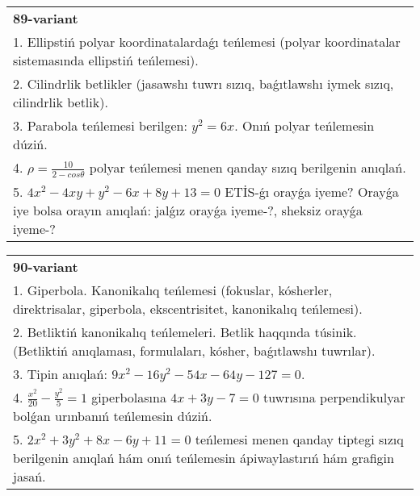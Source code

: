 \documentclass{article}
\begin{document}
\begin{tabular}{m{17cm}}
\textbf{89-variant}\\
1. Ellipstiń polyar koordinatalardaǵı teńlemesi (polyar koordinatalar sistemasında ellipstiń teńlemesi).\\

2. Cilindrlik betlikler (jasawshı tuwrı sızıq, baǵıtlawshı iymek sızıq, cilindrlik betlik).\\

3. Parabola teńlemesi berilgen: $y^2=6 x$. Onıń polyar teńlemesin dúziń.\\

4. $\rho = \frac{10}{2 - cos\theta}$ polyar teńlemesi menen qanday sızıq berilgenin anıqlań.  \\

5. $4x^{2} - 4xy + y^{2} - 6x + 8y + 13 = 0$ ETİS-ǵı orayǵa iyeme? Orayǵa iye bolsa orayın anıqlań: jalǵız orayǵa iyeme-?, sheksiz orayǵa iyeme-?  
\end{tabular}
\vspace{1cm}


\begin{tabular}{m{17cm}}
\textbf{90-variant}\\
1. Giperbola. Kanonikalıq teńlemesi (fokuslar, kósherler, direktrisalar, giperbola, ekscentrisitet, kanonikalıq teńlemesi).\\

2. Betliktiń kanonikalıq teńlemeleri. Betlik haqqında túsinik. (Betliktiń anıqlaması, formulaları, kósher, baǵıtlawshı tuwrılar).\\

3. Tipin anıqlań: $9 x^{2}-16 y^{2}-54 x-64 y-127=0$.\\

4. $\frac{x^{2}}{20} - \frac{y^{2}}{5} = 1$ giperbolasına $4x + 3y - 7 = 0$ tuwrısına perpendikulyar bolǵan urınbanıń teńlemesin dúziń.  \\

5. $2x^{2} + 3y^{2} + 8x - 6y + 11 = 0$ teńlemesi menen qanday tiptegi sızıq berilgenin anıqlań hám onıń teńlemesin ápiwaylastırıń hám grafigin jasań.  
\end{tabular}
\vspace{1cm}
\end{document}

